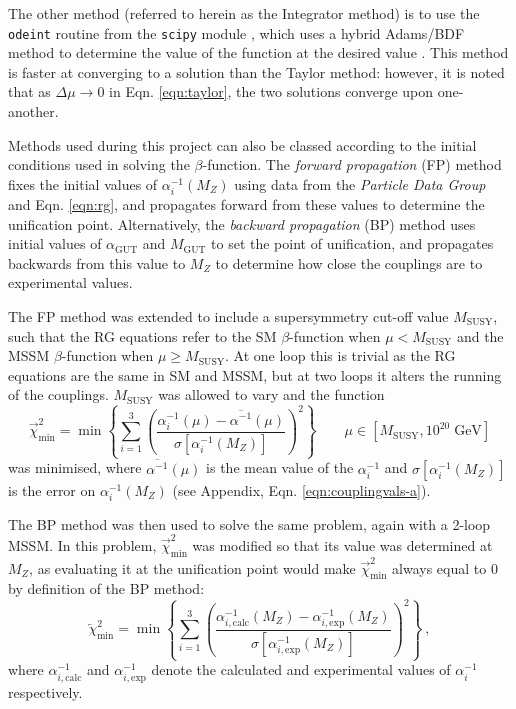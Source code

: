 \documentclass[12pt,a4paper,oneside]{article}
\begin{document}
The other method (referred to herein as the Integrator method) is to use the \texttt{odeint} routine from the \texttt{scipy} module \cite{odeint}, which uses a hybrid Adams/BDF method to determine the value of the function at the desired value \cite{adams, bdf}. This method is faster at converging to a solution than the Taylor method: however, it is noted that as $\Delta \mu \rightarrow 0$ in Eqn. \ref{eqn:taylor}, the two solutions converge upon one-another.

Methods used during this project can also be classed according to the initial conditions used in solving the $\beta$-function. The \textit{forward propagation} (FP) method fixes the initial values of $\alpha_i^{-1}(M_Z)$ using data from the \textit{Particle Data Group} \cite{pdg} and Eqn. \ref{eqn:rg}, and propagates forward from these values to determine the unification point. Alternatively, the \textit{backward propagation} (BP) method uses initial values of $\alpha_\mathrm{GUT}$ and $M_\mathrm{GUT}$ to set the point of unification, and propagates backwards from this value to $M_Z$ to determine how close the couplings are to experimental values.

The FP method was extended to include a supersymmetry cut-off value $M_\mathrm{SUSY}$, such that the RG equations refer to the SM $\beta$-function when $\mu < M_\mathrm{SUSY}$ and the MSSM $\beta$-function when $\mu \geq M_\mathrm{SUSY}$. At one loop this is trivial as the RG equations are the same in SM and MSSM, but at two loops it alters the running of the couplings. $M_\mathrm{SUSY}$ was allowed to vary and the function
\begin{equation}
\overrightarrow{\chi}^2_\mathrm{min} = \min\left\lbrace \sum_{i = 1}^{3} \left(\dfrac{\alpha_i^{-1}(\mu) - \overline{\alpha^{-1}}(\mu)}{\sigma[\alpha_i^{-1}(M_Z)]}\right)^2 \right\rbrace \qquad \mu \in [M_\mathrm{SUSY}, 10^{20} \;\mathrm{GeV}]
\label{eqn:susy-min-fp}
\end{equation}
was minimised, where $\overline{\alpha^{-1}}(\mu)$ is the mean value of the $\alpha_i^{-1}$ and $\sigma[\alpha_i^{-1}(M_Z)]$ is the error on $\alpha_i^{-1}(M_Z)$ (see Appendix, Eqn. \ref{eqn:couplingvals-a}).

The BP method was then used to solve the same problem, again with a 2-loop MSSM. In this problem, $\overrightarrow{\chi}^2_\mathrm{min}$ was modified so that its value was determined at $M_Z$, as evaluating it at the unification point would make $\overrightarrow{\chi}^2_\mathrm{min}$ always equal to 0 by definition of the BP method:
\begin{equation}
\overleftarrow{\chi}^2_\mathrm{min} = \min\left\lbrace \sum_{i = 1}^{3} \left(\dfrac{\alpha_{i,\mathrm{calc}}^{-1}(M_Z) - \alpha_{i,\mathrm{exp}}^{-1}(M_Z)}{\sigma[\alpha_{i,\mathrm{exp}}^{-1}(M_Z)]}\right)^2 \right\rbrace \:,
\label{eqn:susy-min-bp}
\end{equation}
where $\alpha_{i,\mathrm{calc}}^{-1}$ and $\alpha_{i,\mathrm{exp}}^{-1}$ denote the calculated and experimental values of $\alpha_i^{-1}$ respectively.
\end{document}
